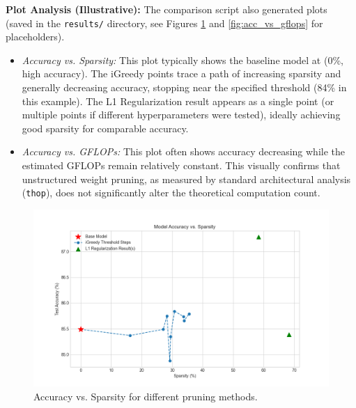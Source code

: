 \documentclass[10pt, article]{article} %
\begin{document}
\textbf{Plot Analysis (Illustrative):}
The comparison script also generated plots (saved in the \texttt{results/} directory, see Figures \ref{fig:acc_vs_sparsity} and \ref{fig:acc_vs_gflops} for placeholders).
\begin{itemize}
    \item \textit{Accuracy vs. Sparsity:} This plot typically shows the baseline model at (0\%, high accuracy). The iGreedy points trace a path of increasing sparsity and generally decreasing accuracy, stopping near the specified threshold (84\% in this example). The L1 Regularization result appears as a single point (or multiple points if different hyperparameters were tested), ideally achieving good sparsity for comparable accuracy.
    \item \textit{Accuracy vs. GFLOPs:} This plot often shows accuracy decreasing while the estimated GFLOPs remain relatively constant. This visually confirms that unstructured weight pruning, as measured by standard architectural analysis (\texttt{thop}), does not significantly alter the theoretical computation count.
\end{itemize}

\begin{figure}
    \centering
    \includegraphics[width=1.0\linewidth]{results/accuracy_vs_sparsity.png}
    \caption{Accuracy vs. Sparsity for different pruning methods.}
    \label{fig:acc_vs_sparsity}
\end{figure}
\end{document}
